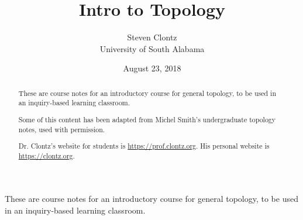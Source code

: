 \documentclass[10pt,]{article}
\title{Intro to Topology}
\author{Steven Clontz\\
University of South Alabama
}
\date{August 23, 2018}
\begin{document}
\hypertarget{index}{}
\maketitle
\thispagestyle{empty}
\begin{abstract}
\hypertarget{p-1}{}%
These are course notes for an introductory course for general topology, to be used in an inquiry-based learning classroom.%
\par
\hypertarget{p-2}{}%
Some of this content has been adapted from Michel Smith's undergraduate topology notes, used with permission.%
\par
\hypertarget{p-3}{}%
Dr. Clontz's website for students is \url{https://prof.clontz.org}. His personal website is \url{https://clontz.org}.%
\end{abstract}
\hypertarget{p-4}{}%
These are course notes for an introductory course for general topology, to be used in an inquiry-based learning classroom.%
%
%
\typeout{************************************************}
\typeout{************************************************}
%
\end{document}
